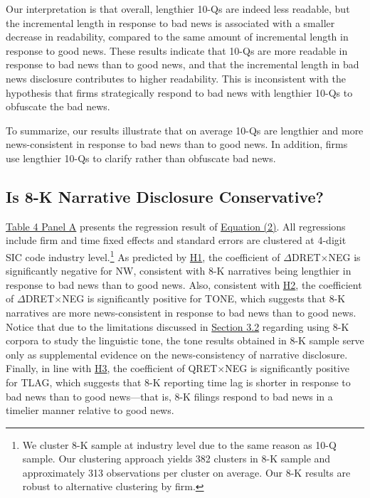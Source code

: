 \documentclass[letterpaper,11pt]{article}
\begin{document}
\begin{spacing}{1.5}
Our interpretation is that overall, lengthier 10-Qs are indeed less readable, but the incremental length in response to bad news is associated with a smaller decrease in readability, compared to the same amount of incremental length in response to good news. These results indicate that 10-Qs are more readable in response to bad news than to good news, and that the incremental length in bad news disclosure contributes to higher readability. This is inconsistent with the hypothesis that firms strategically respond to bad news with lengthier 10-Qs to obfuscate the bad news. 

To summarize, our results illustrate that on average 10-Qs are lengthier and more news-consistent in response to bad news than to good news. In addition, firms use lengthier 10-Qs to clarify rather than obfuscate bad news.

\subsection{Is 8-K Narrative Disclosure Conservative?}
\noindent \hyperref[T4PA]{Table 4 Panel A} presents the regression result of \hyperref[eq2]{Equation (2)}. All regressions include firm and time fixed effects and standard errors are clustered at 4-digit SIC code industry level.\footnote{We cluster 8-K sample at industry level due to the same reason as 10-Q sample. Our clustering approach yields 382 clusters in 8-K sample and approximately 313 observations per cluster on average. Our 8-K results are robust to alternative clustering by firm. } As predicted by \hyperref[h1]{H1}, the coefficient of $\Delta$DRET$\times$NEG is significantly negative for NW, consistent with 8-K narratives being lengthier in response to bad news than to good news. Also, consistent with \hyperref[h2]{H2}, the coefficient of $\Delta$DRET$\times$NEG is significantly positive for TONE, which suggests that 8-K narratives are more news-consistent in response to bad news than to good news. Notice that due to the limitations discussed in \hyperref[sec3.2]{Section 3.2} regarding using 8-K corpora to study the linguistic tone, the tone results obtained in 8-K sample serve only as supplemental evidence on the news-consistency of narrative disclosure. Finally, in line with \hyperref[h3]{H3}, the coefficient of QRET$\times$NEG is significantly positive for TLAG, which suggests that 8-K reporting time lag is shorter in response to bad news than to good news---that is, 8-K filings respond to bad news in a timelier manner relative to good news. 


\end{spacing}
\end{document}
